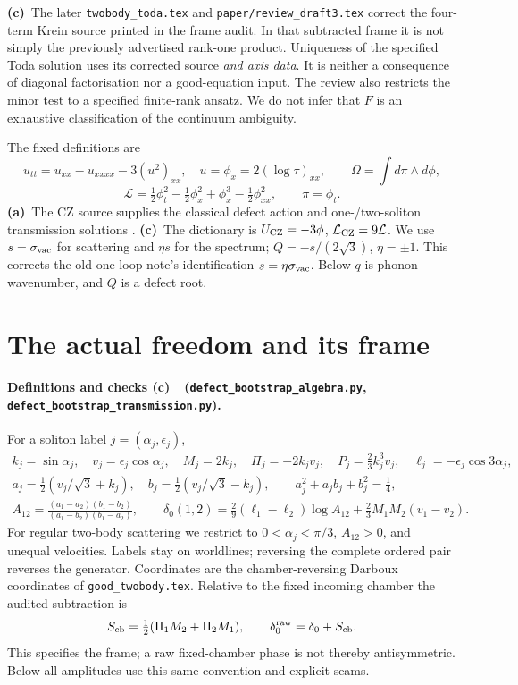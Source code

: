 \documentclass[11pt,a4paper]{article}
\newcommand{\C}{\textbf{(c)}\ }
\newcommand{\A}{\textbf{(a)}\ }
\newcommand{\file}[1]{\nolinkurl{#1}}
\newcommand{\alg}{\file{defect_bootstrap_algebra.py}}
\newcommand{\tra}{\file{defect_bootstrap_transmission.py}}
\begin{document}
\C The later \file{twobody_toda.tex} and \file{paper/review_draft3.tex}
correct the four-term Krein source printed in the frame audit. In that
subtracted frame it is not simply the previously advertised rank-one
product. Uniqueness of the specified Toda solution uses its corrected
source \emph{and axis data}. It is neither a consequence of diagonal
factorisation nor a good-equation input. The review also restricts the
minor test to a specified finite-rank ansatz. We do not infer that $F$ is
an exhaustive classification of the continuum ambiguity.

The fixed definitions are
\[
 u_{tt}=u_{xx}-u_{xxxx}-3(u^2)_{xx},\quad u=\phi_x=2(\log\tau)_{xx},
 \qquad \Omega=\int d\pi\wedge d\phi,
\]
\[
 \mathcal L=\tfrac12\phi_t^2-\tfrac12\phi_x^2+\phi_x^3
               -\tfrac12\phi_{xx}^2,\qquad \pi=\phi_t.
\]
\A The CZ source supplies the classical defect action and one-/two-soliton
transmission solutions \cite[Secs.~2, 3.4, 5.1--5.2]{CZ}.
\C The dictionary is $U_{\rm CZ}=-3\phi$, $\mathcal L_{\rm CZ}=9\mathcal L$.
We use $s=\sigma_{\rm vac}$ for scattering and $\eta s$ for the spectrum;
$Q=-s/(2\sqrt3)$, $\eta=\pm1$. This corrects the old one-loop note's
identification $s=\eta\sigma_{\rm vac}$. Below $q$ is phonon wavenumber,
and $Q$ is a defect root.

\section{The actual freedom and its frame}
\paragraph{Definitions and checks \C\ (\alg, \tra).}
For a soliton label $j=(\alpha_j,\epsilon_j)$,
\begin{gather}
 k_j=\sin\alpha_j,\quad v_j=\epsilon_j\cos\alpha_j,\quad
 M_j=2k_j,\quad \Pi_j=-2k_jv_j,\quad P_j=\tfrac23 k_j^3v_j,\quad
 \ell_j=-\epsilon_j\cos3\alpha_j,\label{data}\\
 a_j=\tfrac12(v_j/\sqrt3+k_j),\quad
 b_j=\tfrac12(v_j/\sqrt3-k_j),\qquad
 a_j^2+a_jb_j+b_j^2=\tfrac14,\label{conic}\\
 A_{12}=\frac{(a_1-a_2)(b_1-b_2)}{(a_1-b_2)(b_1-a_2)},\qquad
 \delta_0(1,2)=\tfrac29(\ell_1-\ell_2)\log A_{12}
                  +\tfrac23M_1M_2(v_1-v_2).\label{bulkclass}
\end{gather}
For regular two-body scattering we restrict to $0<\alpha_j<\pi/3$,
$A_{12}>0$, and unequal velocities. Labels stay on worldlines; reversing the
complete ordered pair reverses the generator. Coordinates are the
chamber-reversing Darboux coordinates of \file{good_twobody.tex}.
Relative to the fixed incoming chamber the audited subtraction is
\begin{equation}
 S_{\rm cb}=\tfrac12(\Pi_1M_2+\Pi_2M_1),\qquad
 \delta_0^{\rm raw}=\delta_0+S_{\rm cb}.\label{frame}
\end{equation}
This specifies the frame; a raw fixed-chamber phase is not thereby
antisymmetric. Below all amplitudes use this same convention and explicit seams.
\end{document}
